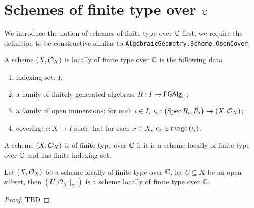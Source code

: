 \chapter{Schemes of finite type over $\mathbb{C}$}

We introduce the notion of schemes of finite type over $\mathbb{C}$ first, we require the definition to be constructive similar
to {\tt AlgebraicGeometry.Scheme.OpenCover}.

\begin{definition}
  \label{def:SchemeLocallyOfFiniteType}
  A scheme $(X, \mathcal{O}_{X})$ is locally of finite type over $\mathbb{C}$ is the
    following data
    \begin{enumerate}
        \item indexing set: $I$;
        \item a family of finitely generated algebras: $R : I \to \mathsf{FGAlg}_{\mathbb{C}}$;
        \item a family of open immersions: for each $i \in I$, $\iota_i: \left(\operatorname*{Spec}{R_i}, \tilde{R_i}\right) \to (X, \mathcal{O}_{X})$;
        \item covering: $c : X \to I$ such that for each $x \in X$, $c_x \in \operatorname*{range}\left({\iota_i}\right)$.
    \end{enumerate}
\end{definition}


\begin{definition}
  \label{def:SchemeOfFiniteType}
  A scheme $(X, \mathcal{O}_{X})$ is of finite type over $\mathbb{C}$ if it is a scheme locally of finite type over $\mathbb{C}$
  and has finite indexing set.
\end{definition}


\begin{proposition}
  Let $(X, \mathcal{O}_{X})$ be a scheme locally of finite type over $\mathbb{C}$, let $U \subseteq X$ be an open subset, then $(U, \mathcal{O}_{X}\mid_{U})$ is a scheme locally of finite type over $\mathbb{C}$.
\end{proposition}
\begin{proof}
TBD
\end{proof}
